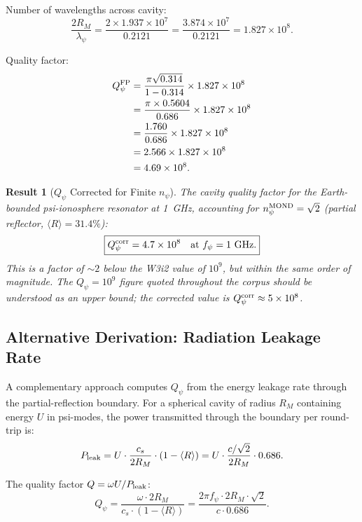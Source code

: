 \documentclass[aps,prd,twocolumn,superscriptaddress]{revtex4-2}
\newcommand{\Qpsi}{Q_\psi}
\newcommand{\npsi}{n_\psi}
\newcommand{\ee}[1]{\times 10^{#1}}
\newtheorem{result}{Result}
\begin{document}
Number of wavelengths across cavity:
\begin{equation}
\frac{2R_M}{\lambda_\psi} = \frac{2 \times 1.937\ee7}{0.2121}
= \frac{3.874\ee7}{0.2121} = 1.827\ee8.
\end{equation}

Quality factor:
\begin{align}
\Qpsi^{\rm FP} &= \frac{\pi\sqrt{0.314}}{1 - 0.314} \times 1.827\ee8 \notag\\
&= \frac{\pi \times 0.5604}{0.686} \times 1.827\ee8 \notag\\
&= \frac{1.760}{0.686} \times 1.827\ee8 \notag\\
&= 2.566 \times 1.827\ee8 \notag\\
&= 4.69\ee8. \label{eq:Q-FP-numerical}
\end{align}

\begin{result}[$\Qpsi$ Corrected for Finite $\npsi$]
\label{res:Qpsi}
The cavity quality factor for the Earth-bounded psi-ionosphere resonator
at 1~GHz, accounting for $\npsi^{\rm MOND} = \sqrt{2}$ (partial
reflector, $\langle R \rangle = 31.4\%$):
\begin{equation}
\boxed{\Qpsi^{\rm corr} = 4.7\ee8 \quad\text{at }f_\psi = 1~\text{GHz}.}
\label{eq:Qpsi-corrected}
\end{equation}
This is a factor of $\sim 2$ below the W3i2 value of $10^9$, but
within the same order of magnitude.  The $\Qpsi = 10^9$ figure quoted
throughout the corpus should be understood as an upper bound; the
corrected value is $\Qpsi^{\rm corr} \approx 5\ee8$.
\end{result}

\subsection{Alternative Derivation: Radiation Leakage Rate}

A complementary approach computes $\Qpsi$ from the energy leakage
rate through the partial-reflection boundary.  For a spherical cavity
of radius $R_M$ containing energy $U$ in psi-modes, the power
transmitted through the boundary per round-trip is:
\begin{equation}
P_{\rm leak} = U \cdot \frac{c_s}{2R_M} \cdot (1 - \langle R \rangle)
= U \cdot \frac{c/\sqrt{2}}{2 R_M} \cdot 0.686.
\label{eq:P-leak}
\end{equation}

The quality factor $Q = \omega U / P_{\rm leak}$:
\begin{equation}
\Qpsi = \frac{\omega \cdot 2R_M}{c_s \cdot (1-\langle R\rangle)}
= \frac{2\pi f_\psi \cdot 2R_M \cdot\sqrt{2}}{c \cdot 0.686}.
\label{eq:Q-radiation}
\end{equation}
\end{document}
